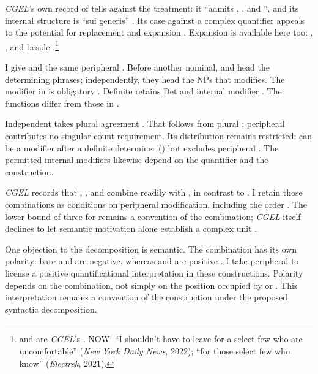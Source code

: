 \documentclass[12pt]{article}
\begin{document}
\textit{CGEL}'s own record of  tells against the treatment: it \enquote{admits , , and }, and its internal structure is \enquote{sui generis} \citep[392, 394]{huddleston2002}. Its case against a complex quantifier  appeals to the potential for replacement and expansion \citep[351--352]{huddleston2002}. Expansion is available here too: , , and  beside .\footnote{ and  are \textit{CGEL}'s \citep[392]{huddleston2002}. NOW: \enquote{I shouldn't have to leave for a select few who are uncomfortable} (\textit{New York Daily News}, 2022); \enquote{for those select few who know} (\textit{Electrek}, 2021).}

I give  and  the same peripheral . Before another nominal,  and  head the determining phrases; independently, they head the NPs that  modifies. The modifier in  is obligatory \citep[394]{huddleston2002}. Definite  retains Det  and internal modifier  \citep[392]{huddleston2002}. The functions differ from those in .

Independent  takes plural agreement \citep[392]{huddleston2002}. That follows from plural ; peripheral  contributes no singular-count requirement. Its distribution remains restricted:  can be a modifier after a definite determiner () \citep[392]{huddleston2002} but excludes peripheral . The permitted internal modifiers likewise depend on the quantifier and the construction.

\textit{CGEL} records that , , and  combine readily with , in contrast to  \citep[392]{huddleston2002}. I retain those combinations as conditions on peripheral modification, including the order . The lower bound of three for  \citep[392]{huddleston2002} remains a convention of the combination; \textit{CGEL} itself declines to let semantic motivation alone establish a complex unit \citep[621]{huddleston2002}.

One objection to the decomposition is semantic. The combination has its own polarity: bare  and  are negative, whereas  and  are positive \citep[393--394]{huddleston2002}. I take peripheral  to license a positive quantificational interpretation in these constructions. Polarity depends on the combination, not simply on the position occupied by  or . This interpretation remains a convention of the construction under the proposed syntactic decomposition.
\end{document}
